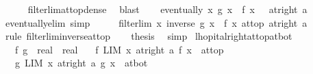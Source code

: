 \begin{isabellebody}
\ \ \ \ \isamarkupfalse%
\ filterlim{\isacharunderscore}{\kern0pt}at{\isacharunderscore}{\kern0pt}top{\isacharunderscore}{\kern0pt}dense\ \isamarkupfalse%
\ blast{\isacharplus}{\kern0pt}\isanewline
\ \ \isamarkupfalse%
\ {\isachardoublequoteopen}eventually\ {\isacharparenleft}{\kern0pt}{\isasymlambda}x{\isachardot}{\kern0pt}\ g\ x\ {\isacharslash}{\kern0pt}\ f\ x\ {\isachargreater}{\kern0pt}\ {}{\isacharparenright}{\kern0pt}\ {\isacharparenleft}{\kern0pt}at{\isacharunderscore}{\kern0pt}right\ a{\isacharparenright}{\kern0pt}{\isachardoublequoteclose}\ \isamarkupfalse%
\ eventually{\isacharunderscore}{\kern0pt}elim\ simp\isanewline
\ \ \isamarkupfalse%
\ \isamarkupfalse%
\ {\isachardoublequoteopen}filterlim\ {\isacharparenleft}{\kern0pt}{\isasymlambda}x{\isachardot}{\kern0pt}\ inverse\ {\isacharparenleft}{\kern0pt}g\ x\ {\isacharslash}{\kern0pt}\ f\ x{\isacharparenright}{\kern0pt}{\isacharparenright}{\kern0pt}\ at{\isacharunderscore}{\kern0pt}top\ {\isacharparenleft}{\kern0pt}at{\isacharunderscore}{\kern0pt}right\ a{\isacharparenright}{\kern0pt}{\isachardoublequoteclose}\isanewline
\ \ \ \ \isamarkupfalse%
\ {\isacharparenleft}{\kern0pt}rule\ filterlim{\isacharunderscore}{\kern0pt}inverse{\isacharunderscore}{\kern0pt}at{\isacharunderscore}{\kern0pt}top{\isacharparenright}{\kern0pt}\isanewline
\ \ \isamarkupfalse%
\ {\isacharquery}{\kern0pt}thesis\ \isamarkupfalse%
\ simp\isanewline
{}\isamarkupfalse%
%
\endisatagproof
{\isafoldproof}%
%
\isadelimproof
\isanewline
%
\endisadelimproof
\isanewline
{}\isamarkupfalse%
\ lhopital{\isacharunderscore}{\kern0pt}right{\isacharunderscore}{\kern0pt}at{\isacharunderscore}{\kern0pt}top{\isacharunderscore}{\kern0pt}at{\isacharunderscore}{\kern0pt}bot{\isacharcolon}{\kern0pt}\isanewline
\ \ \ f\ g\ {\isacharcolon}{\kern0pt}{\isacharcolon}{\kern0pt}\ {\isachardoublequoteopen}real\ {\isasymRightarrow}\ real{\isachardoublequoteclose}\isanewline
\ \ \ f{\isacharunderscore}{\kern0pt}{}{\isacharcolon}{\kern0pt}\ {\isachardoublequoteopen}LIM\ x\ at{\isacharunderscore}{\kern0pt}right\ a{\isachardot}{\kern0pt}\ f\ x\ {\isacharcolon}{\kern0pt}{\isachargreater}{\kern0pt}\ at{\isacharunderscore}{\kern0pt}top{\isachardoublequoteclose}\isanewline
\ \ \ g{\isacharunderscore}{\kern0pt}{}{\isacharcolon}{\kern0pt}\ {\isachardoublequoteopen}LIM\ x\ at{\isacharunderscore}{\kern0pt}right\ a{\isachardot}{\kern0pt}\ g\ x\ {\isacharcolon}{\kern0pt}{\isachargreater}{\kern0pt}\ at{\isacharunderscore}{\kern0pt}bot{\isachardoublequoteclose}\isanewline

\end{isabellebody}
